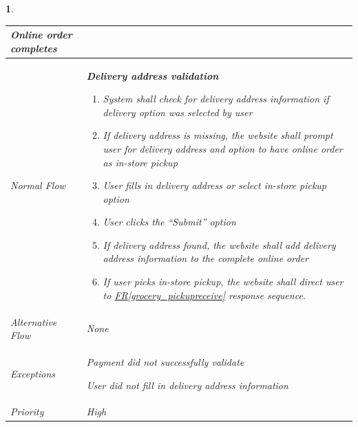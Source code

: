 \documentclass{scrreprt}
\theoremstyle{funreq}
\newtheorem{funreq}{}
\newcommand*{\reqref}[1]{\hyperref[#1]{FR\ref*{#1}}}
\begin{document}
\begin{funreq}
\begin{table}[H]
{\begin{tabularx}{\columnwidth}{|l|X|}
					
                    Online order completes
					\\ \hline Normal Flow &
					\bfseries{Delivery address validation}\normalfont\newline 
					\begin{enumerate}
					    \item System shall check for delivery address information if delivery option was selected by user
					    \item If delivery address is missing, the website shall prompt user for delivery address and option to have online order as in-store pickup
                        \item User fills in delivery address or select in-store pickup option
                        \item User clicks the “Submit” option
                        \item If delivery address found, the website shall add delivery address information to the complete online order
                        \item If user picks in-store pickup, the website shall direct user to \reqref{grocery_pickupreceive} response sequence.
					\end{enumerate}
					\\ \hline Alternative Flow & 
					None
					\\ \hline Exceptions & Payment did not successfully validate
					
					
                        User did not fill in delivery address information
					\\ \hline Priority & 
					High
					\\ \hline
				\end{tabularx}%
			}
		\end{table}
	\end{funreq}
	
\end{document}
